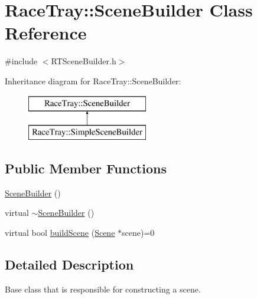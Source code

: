 \hypertarget{class_race_tray_1_1_scene_builder}{\section{Race\-Tray\-:\-:Scene\-Builder Class Reference}
\label{class_race_tray_1_1_scene_builder}
}


{\ttfamily \#include $<$R\-T\-Scene\-Builder.\-h$>$}

Inheritance diagram for Race\-Tray\-:\-:Scene\-Builder\-:\begin{figure}[H]
\begin{center}
\leavevmode
\includegraphics[height=2.000000cm]{class_race_tray_1_1_scene_builder}
\end{center}
\end{figure}
\subsection*{Public Member Functions}
\begin{DoxyCompactItemize}
\item 
\hyperlink{class_race_tray_1_1_scene_builder_a0669208713bfb4355d5a4769790c97a4}{Scene\-Builder} ()
\item 
virtual \hyperlink{class_race_tray_1_1_scene_builder_a6c1b61bbe691660c4d5dfdb8ce7a0949}{$\sim$\-Scene\-Builder} ()
\item 
virtual bool \hyperlink{class_race_tray_1_1_scene_builder_abc2dfdc80fe63a47292e5d6f4618d26f}{build\-Scene} (\hyperlink{class_race_tray_1_1_scene}{Scene} $\ast$scene)=0
\end{DoxyCompactItemize}


\subsection{Detailed Description}
Base class that is responsible for constructing a scene. 

